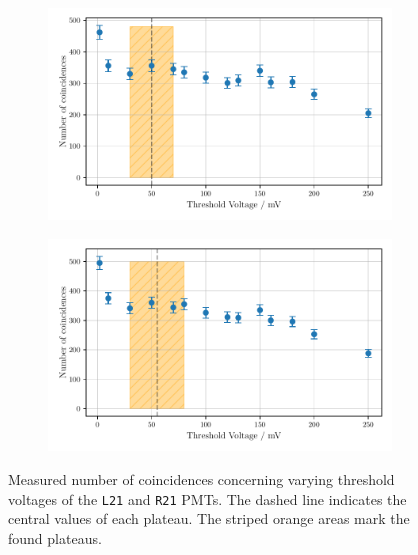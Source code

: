 \begin{figure}
    \centering
    \begin{subfigure}[b]{0.48\textwidth}
        \includegraphics[width=\textwidth]{plots/threshL21.pdf}
    \end{subfigure}\hfill
    \begin{subfigure}[b]{0.48\textwidth}
        \includegraphics[width=\textwidth]{plots/threshR21.pdf}
    \end{subfigure}
    \caption{Measured number of coincidences concerning varying threshold voltages
    of the \texttt{L21} and \texttt{R21} PMTs.
    The dashed line indicates the central values of each plateau. The striped orange areas mark the found plateaus.}
    \label{fig:appthresh6}
\end{figure}

